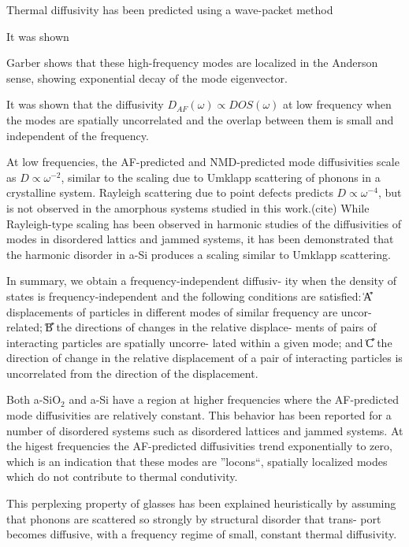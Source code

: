 \documentclass[aps,prb,twocolumn,superscriptaddress,footinbib,amsmath,amssymb,floatfix]{revtex4}
\begin{document}
{Thermal diffusivity has been predicted using a wave-packet method

It was shown 

Garber shows that these high-frequency modes are localized in the 
Anderson sense, showing exponential decay of the mode eigenvector.
\cite{garber_numerical_2001}

It was shown that the diffusivity $D_{AF}(\omega) \propto DOS(\omega)$ 
at low frequency when the modes are spatially uncorrelated and the 
overlap between them is small and independent of the frequency.
\cite{vitelli_heat_2010,xu_energy_2009}

At low frequencies, the AF-predicted and NMD-predicted mode 
diffusivities scale as $D \propto \omega^{-2}$, similar to the scaling 
due to Umklapp scattering of phonons in a crystalline system. Rayleigh 
scattering due to point defects predicts $D \propto \omega^{-4}$, 
but is not observed in the amorphous systems studied in this work.(cite) 
While Rayleigh-type scaling has been 
observed in harmonic studies of the diffusivities of modes in 
disordered lattics and jammed systems,
\cite{sheng_heat_1991,xu_energy_2009,vitelli_heat_2010} 
it has been demonstrated that the harmonic disorder in a-Si 
produces a scaling similar to Umklapp scattering.
\cite{feldman_thermal_1993}

In summary, we obtain a frequency-independent diffusiv-
ity when the density of states is frequency-independent and
the following conditions are satisfied: ͑A͒ displacements of
particles in different modes of similar frequency are uncor-
related; ͑B͒ the directions of changes in the relative displace-
ments of pairs of interacting particles are spatially uncorre-
lated within a given mode; and ͑C͒ the direction of change in
the relative displacement of a pair of interacting particles is
uncorrelated from the direction of the displacement.

Both a-SiO$_2$ and a-Si have a region at higher frequencies where the 
AF-predicted mode diffusivities are relatively constant. This behavior 
has been reported for a number of disordered systems such as 
disordered lattices
\cite{sheng_heat_1991,beltukov_ioffe-regel_2013,larkin_predicting_2013} 
and jammed systems. At the higest frequencies the AF-predicted 
diffusivities trend exponentially to zero, which is an indication 
that these modes are ''locons``, spatially localized modes which 
do not contribute to thermal condutivity.\cite{allen_diffusons_1999} 

This perplexing property of glasses
has been explained heuristically by assuming that phonons
are scattered so strongly by structural disorder that trans-
port becomes diffusive, with a frequency regime of small,
constant thermal diffusivity.
\cite{kittel_interpretation_1949,sheng_heat_1991,allen_} 



}
\end{document}
